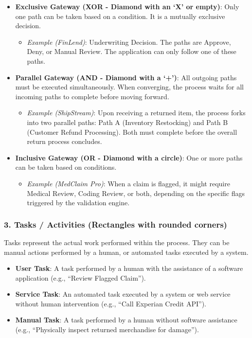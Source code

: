 \begin{itemize}
\tightlist
\item
  \textbf{Exclusive Gateway (XOR - Diamond with an `X' or empty)}: Only
  one path can be taken based on a condition. It is a mutually exclusive
  decision.

  \begin{itemize}
  \tightlist
  \item
    \emph{Example (FinLend)}: Underwriting Decision. The paths are
    Approve, Deny, or Manual Review. The application can only follow one
    of these paths.
  \end{itemize}
\item
  \textbf{Parallel Gateway (AND - Diamond with a `+')}: All outgoing
  paths must be executed simultaneously. When converging, the process
  waits for all incoming paths to complete before moving forward.

  \begin{itemize}
  \tightlist
  \item
    \emph{Example (ShipStream)}: Upon receiving a returned item, the
    process forks into two parallel paths: Path A (Inventory Restocking)
    and Path B (Customer Refund Processing). Both must complete before
    the overall return process concludes.
  \end{itemize}
\item
  \textbf{Inclusive Gateway (OR - Diamond with a circle)}: One or more
  paths can be taken based on conditions.

  \begin{itemize}
  \tightlist
  \item
    \emph{Example (MedClaim Pro)}: When a claim is flagged, it might
    require Medical Review, Coding Review, or both, depending on the
    specific flags triggered by the validation engine.
  \end{itemize}
\end{itemize}

\subsubsection{3. Tasks / Activities (Rectangles with rounded
corners)}\label{tasks-activities-rectangles-with-rounded-corners}

Tasks represent the actual work performed within the process. They can
be manual actions performed by a human, or automated tasks executed by a
system.

\begin{itemize}
\tightlist
\item
  \textbf{User Task}: A task performed by a human with the assistance of
  a software application (e.g., ``Review Flagged Claim'').
\item
  \textbf{Service Task}: An automated task executed by a system or web
  service without human intervention (e.g., ``Call Experian Credit
  API'').
\item
  \textbf{Manual Task}: A task performed by a human without software
  assistance (e.g., ``Physically inspect returned merchandise for
  damage'').
\end{itemize}

